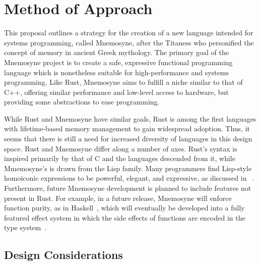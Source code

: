 \documentclass[11pt,a4paper]{article}
\theoremstyle{break}
\begin{document}


\vspace*{-.1in}
\section{Method of Approach}
\label{sec:method}

This proposal outlines a strategy for the creation of a new language intended for systems programming, called Mnemosyne, after the Titaness who personified the concept of memory in ancient Greek mythology. The primary goal of the Mnemosyne project is to create a safe, expressive functional programming language which is nonetheless suitable for high-performance and systems programming. Like Rust, Mnemosyne aims to fulfill a niche similar to that of C++, offering similar performance and low-level access to hardware, but providing some abstractions to ease programming.

While Rust and Mnemosyne have similar goals, Rust is among the first languages with lifetime-based memory management to gain widespread adoption. Thus, it seems that there is still a need for increased diversity of languages in this design space. Rust and Mnemosyne differ along a number of axes. Rust's syntax is inspired primarily by that of C and the languages descended from it, while Mmemosyne's is drawn from the Lisp family. Many programmers find Lisp-style homoiconic expressions to be powerful, elegant, and expressive, as discussed in ~. Furthermore, future Mnemosyne development is planned to include features not present in Rust. For example, in a future release, Mnemosyne will enforce function purity, as in Haskell~\cite{jones2003haskell,hudak1992gentle,hudak1992report}, which will eventually be developed into a fully featured effect system in which the side effects of functions are encoded in the type system~\cite{Marino:2009:GTS:1481861.1481868}.

\subsection{Design Considerations}
\end{document}
